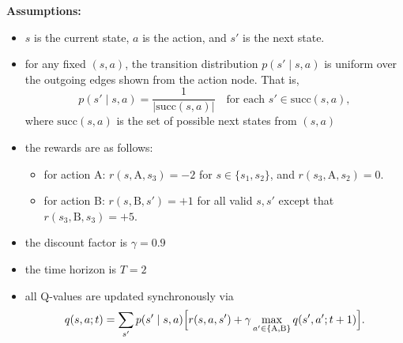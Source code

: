 \textbf{Assumptions:}
\begin{itemize}
  \item $s$ is the current state, $a$ is the action, and $s'$ is the next state.
  \item for any fixed $(s,a)$, the transition distribution $p(s' \mid s,a)$ is uniform over the outgoing edges shown from the action node. That is,
  \[
    p(s'\mid s,a)=\frac{1}{|\mathrm{succ}(s,a)|}\quad \text{for each } s'\in \mathrm{succ}(s,a),
  \]
  where $\mathrm{succ}(s,a)$ is the set of possible next states from $(s,a)$
  \item the rewards are as follows:
  \begin{itemize}
      \item for action A: $r(s,\text{A},s_3) = -2$ for $s\in\{s_1,s_2\}$, and $r(s_3,\text{A},s_2)=0$.
      \item for action B: $r(s,\text{B},s')=+1$ for all valid $s,s'$ except that $r(s_3,\text{B},s_3)=+5$.
  \end{itemize}
  \item the discount factor is $\gamma=0.9$
  \item the time horizon is $T = 2$
  \item all Q-values are updated synchronously via
  \[
    q(s,a; t)=\sum_{s'} p(s'\mid s,a)\Bigl[r(s,a,s')+\gamma \max_{a'\in\{\text{A},\text{B}\}} q(s',a';t+1)\Bigr].
  \]
\end{itemize}

